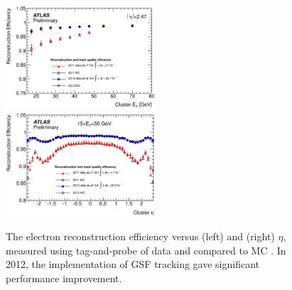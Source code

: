 \begin{figure}
	\includegraphics[width=0.495\textwidth]{tex/selection/el_recoeff_et}
	\hfill
	\includegraphics[width=0.495\textwidth]{tex/selection/el_recoeff_eta}
	\caption{The electron reconstruction efficiency versus (left) \et and (right) 
	$\eta$, measured using tag-and-probe of \HepProcess{\PZ \HepTo \Pe\Pe} data 
	and compared to MC \cite{ElectronPerf:2012}. In 2012, the implementation of GSF 
	tracking gave significant performance improvement.}
	\label{fig:objects:el_recoeff}
\end{figure}


